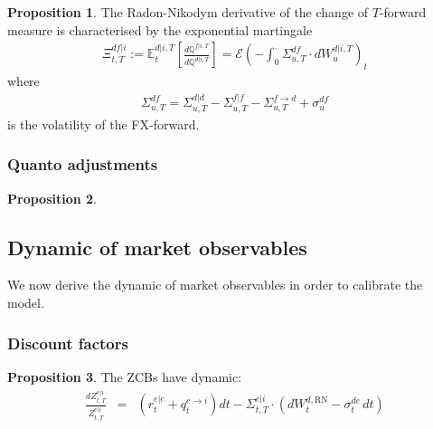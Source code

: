 \documentclass[11pt,english]{amsart}
\newcommand{\RN}{\mathrm{RN}}
\newcommand{\EE}{\mathbb{E}}
\newcommand{\QQ}{\mathbb{Q}}
\newcommand{\Q}{\Xi}
\newcommand{\Qto}{\mathrm{Q}}
\theoremstyle{definition}
\newtheorem{prop}{Proposition}
\newtheorem{defi}{Definition}
\begin{document}
\begin{prop}
The Radon-Nikodym derivative of the change of $T$-forward measure is characterised by the exponential martingale 
\begin{eqnarray}
  \Q^{df|i}_{t,T}  := \EE^{d|i,T}_t\left[ \frac{d\QQ^{f|i,T}}{d\QQ^{d|i,T}} \right] 
  = \mathcal{E}\left( - \int_0^\cdot \Sigma^{df}_{u,T} \cdot dW^{d|i,T}_u \right)_t
  \label{eq:quanto_radon_nikodym}
\end{eqnarray}
where 
\begin{eqnarray}
  \Sigma^{df}_{u,T} 
  = \Sigma^{d|d}_{u,T} - \Sigma^{f|f}_{u,T} - \Sigma^{f\to d}_{u,T}  + \sigma^{df}_{u} 
\end{eqnarray}
is the volatility of the FX-forward.
\end{prop}

\subsubsection{Quanto adjustments}%
 

\begin{prop}

\end{prop}











\newpage%
\subsection{Dynamic of market observables}
We now derive the dynamic of market observables in order to calibrate the model.



\subsubsection{Discount factors}

\begin{prop}
The ZCBs have dynamic:
\begin{eqnarray}
  \frac{dZ^{e|i}_{t,T}}{Z^{e|i}_{t,T}} 
  &=&  \left(r^{e|e}_t + q^{e\to i}_t\right)  dt 
  - \Sigma^{e|i}_{t,T} \cdot \left( dW^{d,\RN}_t -\sigma^{de}_t\, dt\right) 
\end{eqnarray}
\end{prop}
\end{document}
